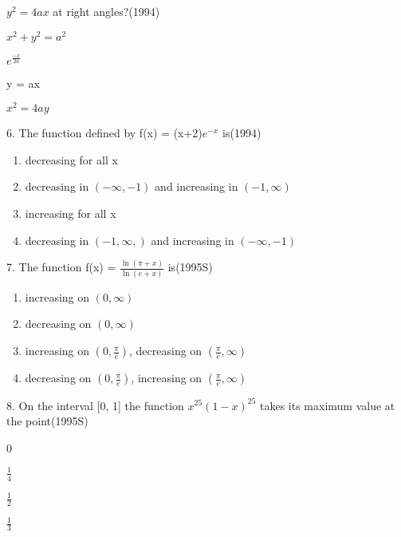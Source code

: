 \documentclass[journal,12pt,twocolumn]{IEEEtran}
\theoremstyle{remark}
\begin{document}
$y^2 = 4ax$ at right angles?\hfill(1994)
\begin{enumerate}[label=\alph*.]
\begin{multicols}{2}
	\item $x^2 + y^2 = a^2$
        \item $e^{\frac{-x}{2a}}$
	\item y = ax
	\item $x^2 = 4ay$
\end{multicols}
\end{enumerate}
6.  The function defined by f(x) = (x+2)$e^{-x}$ 	
is\hfill(1994)
\begin{enumerate}[label=\alph*.]
	\item decreasing for all x
	\item decreasing in $(-\infty, -1)$ and increasing
in $(-1, \infty)$
        \item increasing for all x
        \item decreasing in $(-1, \infty,)$ and increasing
in $(-\infty, -1)$\\
\end{enumerate}
7.  The function f(x) = $\displaystyle\frac{\ln (\pi + x)}{\ln (e + x)}$ 
is\hfill(1995S)\\
\begin{enumerate}[label=\alph*.]
	\item increasing on $(0, \infty)$
	\item decreasing on $(0, \infty)$
	\item increasing on $(0, \displaystyle\frac{\pi}{e})$,
decreasing on $(\displaystyle\frac{\pi}{e}, \infty)$
        \item decreasing on $(0, \displaystyle\frac{\pi}{e})$,
increasing on $(\displaystyle\frac{\pi}{e}, \infty)$\\
\end{enumerate}
8.  On the interval [0, 1] the function $x^{25}(1-x)^{25}$ \indent takes 
its maximum value at the point\hfill(1995S)
\begin{enumerate}[label=\alph*.]
\begin{multicols}{4}
	\item 0 
	\item $\displaystyle\frac{1}{4}$ 
	\item $\displaystyle\frac{1}{2}$ 
        \item $\displaystyle\frac{1}{3}$
\end{multicols}
\end{enumerate}
\newpage
\bigskip
\renewcommand{\thefigure}
{\theenumi}
\renewcommand{\thetable}
{\theenumi}
\end{document}
